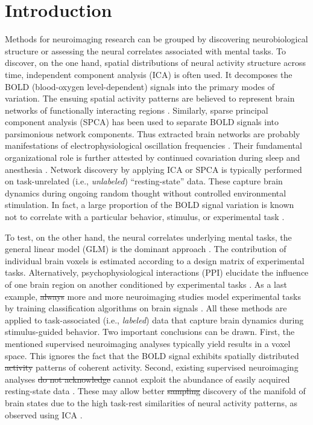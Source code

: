 \documentclass{article} %
\newcommand{\suggestadd}[1]{{\color{blue} #1}}
\newcommand{\suggestremove}[1]{{\color{red} \sout{#1}}}
\begin{document}
\section{Introduction}
%
Methods for neuroimaging research can be grouped by discovering
neurobiological structure or assessing the neural correlates associated
with mental tasks.
To discover, on the one hand, spatial distributions of neural activity
structure across time,
independent component analysis (ICA) \cite{beckmann2005} is often used.
It decomposes the BOLD (blood-oxygen level-dependent) signals into the
primary modes of variation.
The ensuing spatial activity patterns are believed to represent
brain networks of
functionally interacting regions \cite{smith2009}.
Similarly, sparse principal component analysis (SPCA) \cite{varoqu2011}
has been used to
separate BOLD signals into parsimonious network components.
Thus extracted brain networks are probably
manifestations of electrophysiological oscillation frequencies \cite{hipp15}.
Their fundamental organizational role is further
attested by continued covariation during sleep and anesthesia \cite{fox07}.
%
Network discovery by applying ICA or SPCA is typically performed on
task-unrelated (i.e., \textit{unlabeled}) ``resting-state'' data.
These capture brain dynamics
during ongoing random thought without controlled environmental stimulation.
In fact, a large proportion of the BOLD signal \suggestadd{variation} is 
known
not to correlate with a particular behavior, stimulus, or experimental task
\cite{fox07}. 

To test, on the other hand,
the neural correlates underlying mental tasks,
the general linear model (GLM) is the dominant approach \cite{friston94}.
The contribution of
individual brain voxels is estimated
according to a design matrix of experimental tasks.
Alternatively, psychophysiological interactions (PPI)
elucidate the influence of one brain region on another conditioned
by experimental tasks \cite{friston97}.
As a last example, \suggestremove{always} \suggestadd{more and} more 
neuroimaging studies model
experimental tasks by training classification algorithms on brain signals
\cite{poldrack09decoding}.
All these methods are applied to task-associated (i.e., \textit{labeled})
data that capture brain dynamics
during stimulus-guided behavior.
Two important conclusions can be drawn.
First, the mentioned supervised neuroimaging analyses typically yield
results in a voxel space.
This ignores the fact that the BOLD
signal exhibits spatially distributed \suggestremove{activity} patterns
\suggestadd{of coherent activity}.
%
Second, existing supervised neuroimaging analyses
\suggestremove{do not acknowledge} \suggestadd{cannot exploit} the abundance
of easily acquired resting-state data \cite{biswaldiscovery}.
These may allow better \suggestremove{sampling} \suggestadd{discovery of} 
the manifold of brain states
due to the high task-rest similarities of neural activity patterns,
as observed using ICA \cite{smith2009}.
\end{document}
